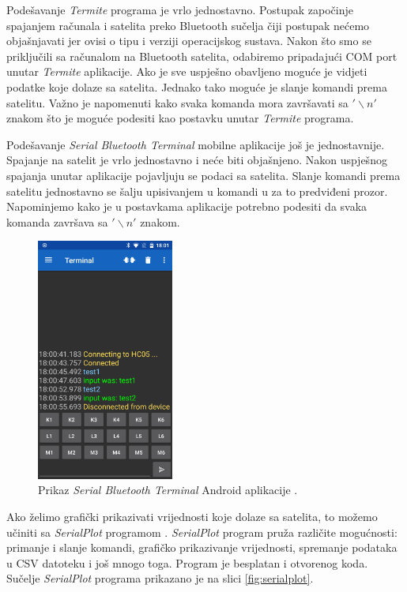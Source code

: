 \documentclass[times, utf8, diplomski, numeric]{templates/template}
\begin{document}
{{        Podešavanje \emph{Termite} programa je vrlo jednostavno. Postupak započinje spajanjem računala i satelita preko Bluetooth sučelja čiji postupak nećemo objašnjavati jer ovisi o tipu i verziji operacijskog sustava. Nakon što smo se priključili sa računalom na Bluetooth satelita, odabiremo pripadajući COM port unutar \emph{Termite} aplikacije. Ako je sve uspješno obavljeno moguće je vidjeti podatke koje dolaze sa satelita. Jednako tako moguće je slanje komandi prema satelitu. Važno je napomenuti kako svaka komanda mora završavati sa $'\backslash n'$ znakom što je moguće podesiti kao postavku unutar \emph{Termite} programa. 
        
        Podešavanje \emph{Serial Bluetooth Terminal} mobilne aplikacije još je jednostavnije. Spajanje na satelit je vrlo jednostavno i neće biti objašnjeno. Nakon uspješnog spajanja unutar aplikacije pojavljuju se podaci sa satelita. Slanje komandi prema satelitu jednostavno se šalju upisivanjem u komandi u za to predviđeni prozor. Napominjemo kako je u postavkama aplikacije potrebno podesiti da svaka komanda završava sa $'\backslash n'$ znakom. 

        \begin{figure}[htb]
        \centering
        \includegraphics[width=0.4\textwidth]{images/mobilna_app.png}
        \caption{Prikaz \emph{Serial Bluetooth Terminal} Android aplikacije \cite{mobilna_app}.}
        \label{fig:mobilna_app}
        \end{figure}
        
        Ako želimo grafički prikazivati vrijednosti koje dolaze sa satelita, to možemo učiniti sa \emph{SerialPlot} programom \cite{serialplot}. \emph{SerialPlot} program pruža različite mogućnosti: primanje i slanje komandi, grafičko prikazivanje vrijednosti, spremanje podataka u CSV datoteku i još mnogo toga. Program je besplatan i otvorenog koda. Sučelje \emph{SerialPlot} programa prikazano je na slici \ref{fig:serialplot}.

}}
\end{document}
